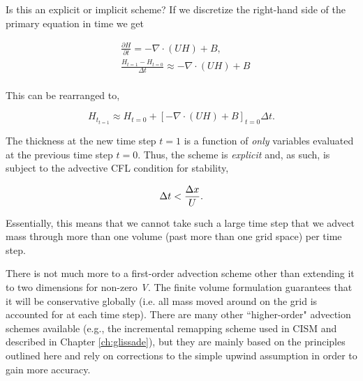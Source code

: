 Is this an explicit or implicit scheme? If we discretize the right-hand side of the primary equation in time we get

\begin{equation}
\begin{split}
  & \frac{\partial H}{\partial t}=-\nabla \cdot \left( UH \right)+B, \\
 & \frac{H_{t=1}-H_{t=0}}{\Delta t}\approx -\nabla \cdot \left( UH \right)+B\\
\end{split}
\end{equation}

This can be rearranged to,

\begin{equation}
H_{t_{t=1}}\approx H_{t=0}+\left[ -\nabla \cdot \left( UH \right)+B \right]_{t=0}\Delta t.
\end{equation}

The thickness at the new time step $t=1$ is a function of \textit{only} variables evaluated at the previous time step $t=0$. Thus, the scheme is \textit{explicit} and, as such, is subject to the advective CFL condition for stability,

\begin{equation}
\Delta t<\frac{\Delta x}{U}.\\
\end{equation}

Essentially, this means that we cannot take such a large time step that we advect mass through more than one volume (past more than one grid space) per time step.

There is not much more to a first-order advection scheme other than extending it to two dimensions for non-zero \textit{V}. The finite volume formulation guarantees that it will be conservative globally (i.e. all mass moved around on the grid is accounted for at each time step). There are many other ``higher-order" advection schemes available (e.g., the incremental remapping scheme used in CISM and described in Chapter \ref{ch:glissade}), but they are mainly based on the principles outlined here and rely on corrections to the simple upwind assumption in order to gain more accuracy.
